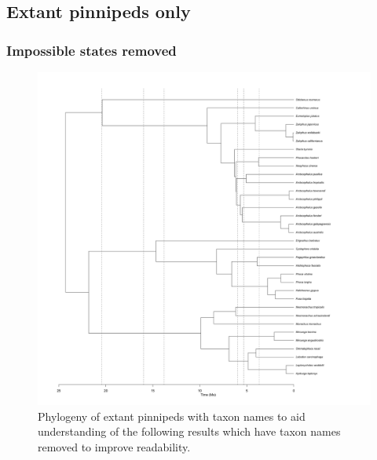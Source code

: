 \documentclass[a4paper, 12pt]{article}
\begin{document}
\subsection{Extant pinnipeds only}
\subsubsection{Impossible states removed}

\begin{figure}[H]
 \centering
  \includegraphics[width = \linewidth]{figures/extant-pinnipeds-tree.png}
  \caption{Phylogeny of extant pinnipeds with taxon names to aid understanding of the following results which have taxon names removed to improve readability.}
  \label{fig-extant-tree}
\end{figure} 
\end{document}
